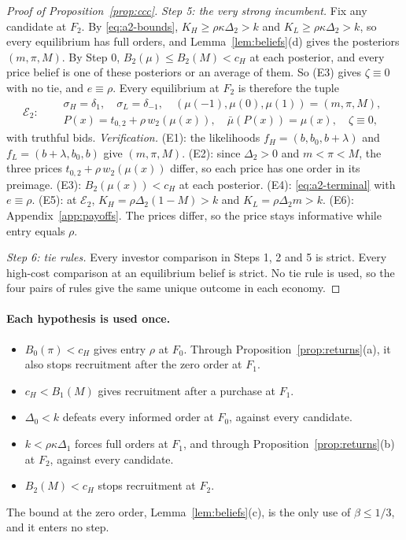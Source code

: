 \begin{proof}[Proof of Proposition~\ref{prop:ccc}]
\emph{Step 5: the very strong incumbent.} Fix any candidate at \(F_2\). By \eqref{eq:a2-bounds},
\(K_H\ge\rho\kappa\Delta_2>k\) and \(K_L\ge\rho\kappa\Delta_2>k\), so every equilibrium has full orders, and
Lemma~\ref{lem:beliefs}(d) gives the posteriors \((m,\pi,M)\). By Step 0, \(B_2(\mu)\le B_2(M)<c_H\) at each
posterior, and every price belief is one of these posteriors or an average of them. So (E3) gives
\(\zeta\equiv0\) with no tie, and \(e\equiv\rho\). Every equilibrium at \(F_2\) is therefore the tuple
\[
\mathcal E_2:\quad
\begin{aligned}
&\sigma_H=\delta_1,\quad \sigma_L=\delta_{-1},\quad (\mu(-1),\mu(0),\mu(1))=(m,\pi,M),\\
&P(x)=t_{0,2}+\rho\,w_2(\mu(x)),\quad \bar\mu(P(x))=\mu(x),\quad \zeta\equiv0,
\end{aligned}
\]
with truthful bids. \emph{Verification.} (E1): the likelihoods \(f_H=(b,b_0,b+\lambda)\) and \(f_L=(b+\lambda,b_0,b)\)
give \((m,\pi,M)\). (E2): since \(\Delta_2>0\) and \(m<\pi<M\), the three
prices \(t_{0,2}+\rho\,w_2(\mu(x))\) differ, so each price has one order in its preimage. (E3): \(B_2(\mu(x))<c_H\)
at each posterior. (E4): \eqref{eq:a2-terminal} with \(e\equiv\rho\). (E5): at \(\mathcal E_2\),
\(K_H=\rho\Delta_2(1-M)>k\) and \(K_L=\rho\Delta_2m>k\). (E6): Appendix~\ref{app:payoffs}. The prices differ, so the
price stays informative while entry equals \(\rho\).

\emph{Step 6: tie rules.} Every investor comparison in Steps 1, 2 and 5 is strict. Every high-cost comparison at an
equilibrium belief is strict. No tie rule is used, so the four pairs of rules give the same unique outcome in each
economy.
\end{proof}

\paragraph{Each hypothesis is used once.}
\begin{itemize}[leftmargin=2em]
\item \(B_0(\pi)<c_H\) gives entry \(\rho\) at \(F_0\). Through Proposition~\ref{prop:returns}(a), it also stops
recruitment after the zero order at \(F_1\).
\item \(c_H<B_1(M)\) gives recruitment after a purchase at \(F_1\).
\item \(\Delta_0<k\) defeats every informed order at \(F_0\), against every candidate.
\item \(k<\rho\kappa\Delta_1\) forces full orders at \(F_1\), and through Proposition~\ref{prop:returns}(b) at \(F_2\),
against every candidate.
\item \(B_2(M)<c_H\) stops recruitment at \(F_2\).
\end{itemize}
The bound at the zero order, Lemma~\ref{lem:beliefs}(c), is the only use of \(\beta\le1/3\), and it enters no step.

